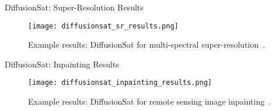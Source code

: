   \begin{refsection}
  \begin{frame}{DiffusionSat: Super-Resolution Results}
    \begin{figure}
      \centering
      \texttt{[image: diffusionsat\_sr\_results.png]}
      \caption[]{\scriptsize Example results: DiffusionSat for multi-spectral super-resolution~\parencite{diffusionset2024}.}
    \end{figure}
    \bottomleftrefs
  \end{frame}
  \end{refsection}
  
  \begin{refsection}
  \begin{frame}{DiffusionSat: Inpainting Results}
    \begin{figure}
      \centering
      \texttt{[image: diffusionsat\_inpainting\_results.png]}
      \caption[]{\scriptsize Example results: DiffusionSat for remote sensing image inpainting~\parencite{diffusionset2024}.}
    \end{figure}
    \bottomleftrefs
  \end{frame}
  \end{refsection}